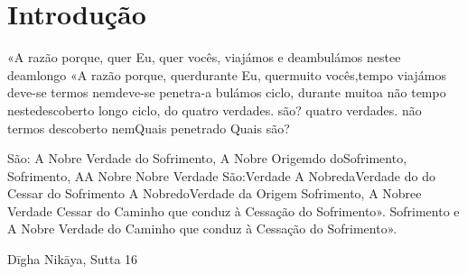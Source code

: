 \chapter{Introdução}

«A razão porque, quer Eu, quer vocês, viajámos e deambulámos nestee deamlongo «A
razão porque, querdurante Eu, quermuito vocês,tempo viajámos deve-se termos
nemdeve-se penetra-a bulámos ciclo, durante muitoa não tempo nestedescoberto
longo ciclo, do quatro verdades. são? quatro verdades. não termos descoberto
nemQuais penetrado Quais são?

São: A Nobre Verdade do Sofrimento, A Nobre Origemdo doSofrimento, Sofrimento,
AA Nobre Nobre Verdade São:Verdade A NobredaVerdade do do Cessar do Sofrimento A
NobredoVerdade da Origem Sofrimento, A Nobree Verdade Cessar do Caminho que
conduz à Cessação do Sofrimento». Sofrimento e A Nobre Verdade do Caminho que
conduz à Cessação do Sofrimento».

Dīgha Nikāya, Sutta 16

